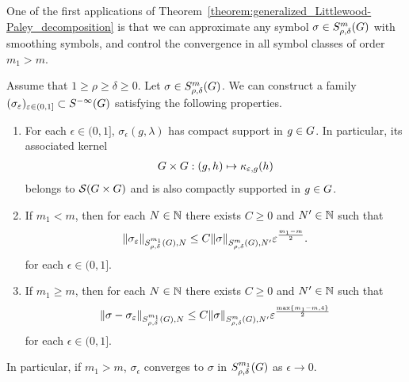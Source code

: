 One of the first applications of Theorem~\ref{theorem:generalized_Littlewood-Paley_decomposition}
is that we can approximate any symbol $\sigma \in \SymbolClass m {\rho, \delta}$ with smoothing symbols,
and control the convergence in all symbol classes of order $m_1 > m$.

\begin{proposition}
\label{proposition:approximation_of_symbols}
    Assume that $1 \geq \rho \geq \delta \geq 0$.
    Let $\sigma \in \SymbolClass m {\rho, \delta}$.
    We can construct a family $(\sigma_\epsilon)_{\epsilon \in (0, 1]} \subset \SmoothingSymbols$ satisfying the following properties.
    \begin{enumerate}
        \item For each $\epsilon \in (0, 1]$,
            $\sigma_\epsilon(g, \lambda)$ has compact support in $g \in \Group$.
            In particular, its associated kernel
            \begin{align*}
                \Group \times \Group : (g, h) \mapsto \kappa_{\epsilon, g}(h)
            \end{align*}
            belongs to $\Schwartz {\Group \times \Group}$ and is also compactly supported in $g \in \Group$.
        \item If $m_1 < m$, then for each $N \in \N$ there exists $C \geq 0$ and $N' \in \N$ such that
            \begin{align*}
                \SymbolSemiNorm {m_1} {\rho, \delta} N {\sigma_\epsilon}
                \leq C \SymbolSemiNorm m {\rho, \delta} {N'} \sigma
                \epsilon^\frac {m_1 - m} 2.
            \end{align*}
            for each $\epsilon \in (0, 1]$.
        \item If $m_1 \geq m$, then for each $N \in \N$ there exists $C \geq 0$ and $N' \in \N$ such that
            \begin{align*}
                \SymbolSemiNorm {m_1} {\rho, \delta} N {\sigma - \sigma_\epsilon}
                \leq C \SymbolSemiNorm m {\rho, \delta} {N'} \sigma
                \epsilon^\frac {\max \{m_1 - m, 4\}} 2
            \end{align*}
            for each $\epsilon \in (0, 1]$.
    \end{enumerate}

    In particular, if $m_1 > m$, $\sigma_\epsilon$ converges to $\sigma$ in $\SymbolClass {m_1} {\rho, \delta}$ as $\epsilon \to 0$.
\end{proposition}
